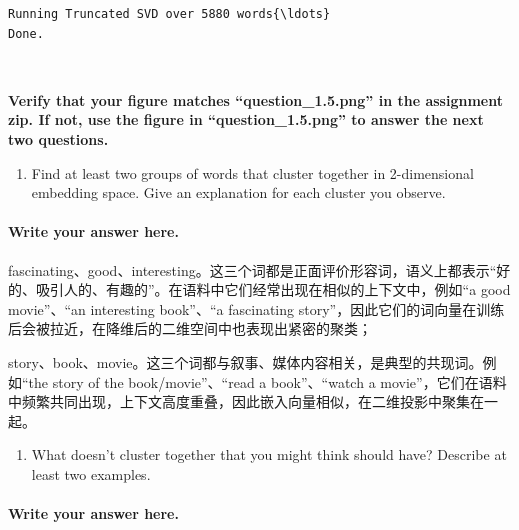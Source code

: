 \documentclass[11pt]{article}
\providecommand{\tightlist}{%
      \setlength{\itemsep}{0pt}\setlength{\parskip}{0pt}}
\begin{document}
    \begin{Verbatim}[commandchars=\\\{\}]
Running Truncated SVD over 5880 words{\ldots}
Done.
    \end{Verbatim}

    \begin{center}
    \end{center}
    { \hspace*{\fill} \\}
    
    \textbf{Verify that your figure matches ``question\_1.5.png'' in the
assignment zip. If not, use the figure in ``question\_1.5.png'' to
answer the next two questions.}

    \begin{enumerate}
\def\labelenumi{\alph{enumi}.}
\tightlist
\item
  Find at least two groups of words that cluster together in
  2-dimensional embedding space. Give an explanation for each cluster
  you observe.
\end{enumerate}

    \paragraph{Write your answer here.}\label{write-your-answer-here.}

fascinating、good、interesting。这三个词都是正面评价形容词，语义上都表示``好的、吸引人的、有趣的''。在语料中它们经常出现在相似的上下文中，例如``a
good movie''、``an interesting book''、``a fascinating
story''，因此它们的词向量在训练后会被拉近，在降维后的二维空间中也表现出紧密的聚类；

story、book、movie。这三个词都与叙事、媒体内容相关，是典型的共现词。例如``the
story of the book/movie''、``read a book''、``watch a
movie''，它们在语料中频繁共同出现，上下文高度重叠，因此嵌入向量相似，在二维投影中聚集在一起。

    \begin{enumerate}
\def\labelenumi{\alph{enumi}.}
\setcounter{enumi}{1}
\tightlist
\item
  What doesn't cluster together that you might think should have?
  Describe at least two examples.
\end{enumerate}

    \paragraph{Write your answer here.}\label{write-your-answer-here.}
\end{document}
